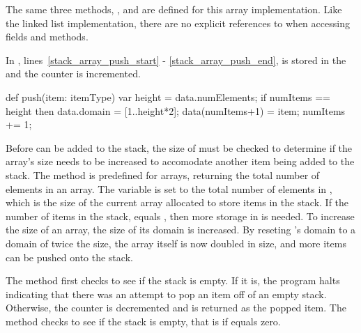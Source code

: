 The same three methods, ,  and  are
defined for this array implementation.  Like the linked list implementation,
there are no explicit references to  when accessing fields and
methods.

In , lines~\ref{stack_array_push_start}
- \ref{stack_array_push_end},  is stored in the 
and the  counter is incremented.  
\begin{chapel}
  def push(item: itemType) {       
    var height = data.numElements;  
    if numItems == height then     
      data.domain = [1..height*2];
    data(numItems+1) = item;        
    numItems += 1;                 
  }                               
\end{chapel}
Before  can be added
to the stack, the size of  must be checked to determine if the array's size
needs to be increased to accomodate another item being added to the stack.
The method  is predefined for arrays, returning the total
number of elements in an array.  The variable  is set to the
total number of elements in , which is the size of the current array
allocated to store items in the stack.
If the number of items in the stack,  equals
, then more storage in  is needed.  To increase the
size of an array, the size of its domain is increased.
By reseting 's
domain to a domain of twice the size, the array  itself is now doubled in size,
and more items can be pushed onto the stack. 

The  method first checks to see if the stack is empty.  If it is, the program
halts indicating that there was an attempt to pop an item off of an empty stack.
Otherwise, the  counter is decremented and 
is returned as the popped item.  The  method checks to see if
the stack is empty, that is if  equals zero.

